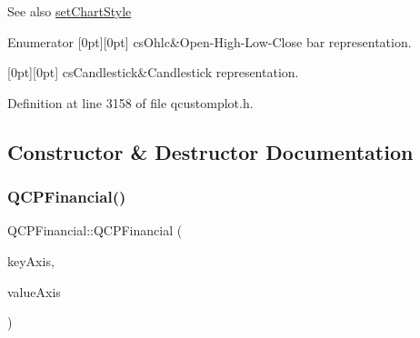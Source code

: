\begin{DoxySeeAlso}{See also}
\hyperlink{class_q_c_p_financial_a5a59175d36279d71596e64d7bb65596f}{set\+Chart\+Style} 
\end{DoxySeeAlso}
\begin{DoxyEnumFields}{Enumerator}
[0pt][0pt]{}\mbox{\label{class_q_c_p_financial_a0f800e21ee98d646dfc6f8f89d10ebfba3a516016c9298d3e95dd82aa203c4390}} 
cs\+Ohlc&Open-\/\+High-\/\+Low-\/\+Close bar representation. \\
\hline

[0pt][0pt]{}\mbox{\label{class_q_c_p_financial_a0f800e21ee98d646dfc6f8f89d10ebfbac803cbd39f26e3f206bcc7028679e62f}} 
cs\+Candlestick&Candlestick representation. \\
\hline

\end{DoxyEnumFields}


Definition at line 3158 of file qcustomplot.\+h.



\subsection{Constructor \& Destructor Documentation}
\mbox{\label{class_q_c_p_financial_a4702d5248feeb9d1ec6e3ce725b10b32}} 
\subsubsection{\texorpdfstring{Q\+C\+P\+Financial()}{QCPFinancial()}}
{\footnotesize\ttfamily Q\+C\+P\+Financial\+::\+Q\+C\+P\+Financial (\begin{DoxyParamCaption}\item[{\hyperlink{class_q_c_p_axis}{Q\+C\+P\+Axis} $\ast$}]{key\+Axis,  }\item[{\hyperlink{class_q_c_p_axis}{Q\+C\+P\+Axis} $\ast$}]{value\+Axis }\end{DoxyParamCaption})\hspace{0.3cm}{\ttfamily [explicit]}}

